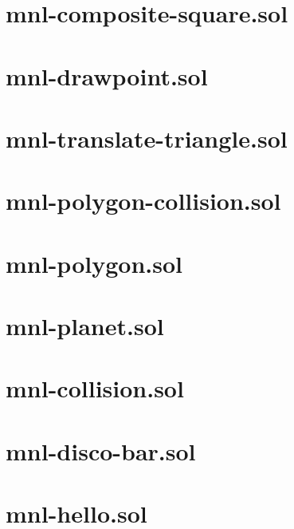 \section{mnl-composite-square.sol}


\section{mnl-drawpoint.sol}


\section{mnl-translate-triangle.sol}


\section{mnl-polygon-collision.sol}


\section{mnl-polygon.sol}


\section{mnl-planet.sol}


\section{mnl-collision.sol}


\section{mnl-disco-bar.sol}


\section{mnl-hello.sol}


